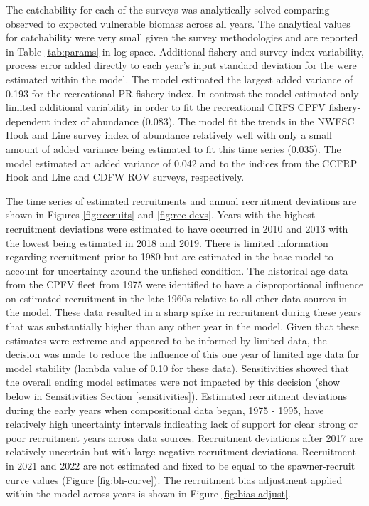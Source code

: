 \documentclass[11pt,
  english,
  letterpaper,
]{article}
\begin{document}
The catchability for each of the surveys was analytically solved comparing observed to expected vulnerable biomass across all years. The analytical values for catchability were very small given the survey methodologies and are reported in Table \ref{tab:params} in log-space. Additional fishery and survey index variability, process error added directly to each year's input standard deviation for the were estimated within the model. The model estimated the largest added variance of 0.193 for the recreational PR fishery index. In contrast the model estimated only limited additional variability in order to fit the recreational CRFS CPFV fishery-dependent index of abundance (0.083). The model fit the trends in the NWFSC Hook and Line survey index of abundance relatively well with only a small amount of added variance being estimated to fit this time series (0.035). The model estimated an added variance of 0.042 and to the indices from the CCFRP Hook and Line and CDFW ROV surveys, respectively.

The time series of estimated recruitments and annual recruitment deviations are shown in Figures \ref{fig:recruits} and \ref{fig:rec-devs}. Years with the highest recruitment deviations were estimated to have occurred in 2010 and 2013 with the lowest being estimated in 2018 and 2019. There is limited information regarding recruitment prior to 1980 but are estimated in the base model to account for uncertainty around the unfished condition. The historical age data from the CPFV fleet from 1975 were identified to have a disproportional influence on estimated recruitment in the late 1960s relative to all other data sources in the model. These data resulted in a sharp spike in recruitment during these years that was substantially higher than any other year in the model. Given that these estimates were extreme and appeared to be informed by limited data, the decision was made to reduce the influence of this one year of limited age data for model stability (lambda value of 0.10 for these data). Sensitivities showed that the overall ending model estimates were not impacted by this decision (show below in Sensitivities Section \ref{sensitivities}). Estimated recruitment deviations during the early years when compositional data began, 1975 - 1995, have relatively high uncertainty intervals indicating lack of support for clear strong or poor recruitment years across data sources. Recruitment deviations after 2017 are relatively uncertain but with large negative recruitment deviations. Recruitment in 2021 and 2022 are not estimated and fixed to be equal to the spawner-recruit curve values (Figure \ref{fig:bh-curve}). The recruitment bias adjustment applied within the model across years is shown in Figure \ref{fig:bias-adjust}.
\end{document}
